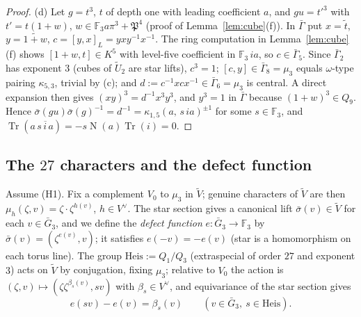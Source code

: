 \documentclass[11pt]{article}
\newcommand{\Fq}{\mathbb F}
\newcommand{\Nm}{\operatorname N}
\newcommand{\Tr}{\operatorname{Tr}}
\newcommand{\tU}{\widetilde U}
\newcommand{\tV}{\widetilde V}
\newcommand{\Pfr}{\mathfrak P}
\newcommand{\Heis}{\mathrm{Heis}}
\theoremstyle{plain}
\theoremstyle{definition}
\begin{document}
\begin{proof}
(d) Let $g=t^3$, $t$ of depth one with leading coefficient $a$, and
$gu=t'^3$ with $t'=t(1+w)$, $w\in\Fq_3a\pi^3+\Pfr^4$
(proof of Lemma~\ref{lem:cube}(f)).  In $\bar\Gamma$ put $x=\tilde t$,
$y=\widetilde{1+w}$, $c=[y,x]_L=yxy^{-1}x^{-1}$.  The ring computation
in Lemma~\ref{lem:cube}(f) shows $[1+w,t]\in K^5$ with level-five
coefficient in $\Fq_3\,ia$, so $c\in\bar\Gamma_5$.  Since $\bar\Gamma_2$
has exponent $3$ (cubes of $\tU_2$ are star lifts), $c^3=1$;
$[c,y]\in\bar\Gamma_8=\mu_3$ equals $\omega$-type pairing $\kappa_{5,3}$,
trivial by (c); and $d:=c^{-1}xcx^{-1}\in\bar\Gamma_6=\mu_3$ is central.
A direct expansion then gives $(xy)^3=d^{-1}x^3y^3$, and $y^3=1$ in
$\bar\Gamma$ because $(1+w)^3\in Q_9$.  Hence
$\bar\sigma(gu)\bar\sigma(g)^{-1}=d^{-1}=\kappa_{1,5}(a,\,s\,ia)^{\pm1}$
for some $s\in\Fq_3$, and $\Tr(a\,\overline{s\,i\,a})=-s\Nm(a)\Tr(i)=0$.
\end{proof}

\subsection{The $27$ characters and the defect function}
Assume (H1).  Fix a complement $V_0$ to $\mu_3$ in $\tV$; genuine
characters of $\tV$ are then $\mu_h(\zeta,v)=\zeta\cdot\zeta^{h(v)}$,
$h\in V^\vee$.  The star section gives a canonical lift
$\bar\sigma(v)\in\tV$ for each $v\in\bar G_3$, and we define the
\emph{defect function} $e:\bar G_3\to\Fq_3$ by
$\bar\sigma(v)=(\zeta^{e(v)},v)$; it satisfies $e(-v)=-e(v)$
(star is a homomorphism on each torus line).  The group
$\Heis:=Q_1/Q_3$ (extraspecial of order $27$ and exponent $3$) acts on
$\tV$ by conjugation, fixing $\mu_3$; relative to $V_0$ the action is
$(\zeta,v)\mapsto(\zeta\zeta^{\beta_s(v)},sv)$ with $\beta_s\in V^\vee$,
and equivariance of the star section gives
\begin{equation}\label{eq:cocycle}
 e(sv)-e(v)=\beta_s(v)\qquad(v\in\bar G_3,\ s\in\Heis).
\end{equation}
\end{document}
